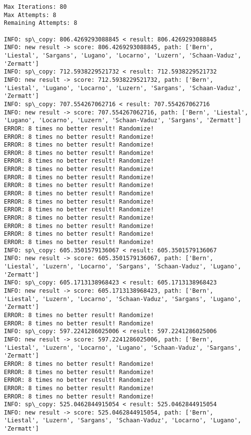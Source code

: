 \documentclass[11pt]{article}
\begin{document}
    \begin{Verbatim}[commandchars=\\\{\}]
Max Iterations: 80
Max Attempts: 8
Remaining Attempts: 8

INFO: sp\_copy: 806.4269293088845 < result: 806.4269293088845
INFO: new result -> score: 806.4269293088845, path: ['Bern', 'Liestal', 'Sargans', 'Lugano', 'Locarno', 'Luzern', 'Schaan-Vaduz', 'Zermatt']
INFO: sp\_copy: 712.5938229521732 < result: 712.5938229521732
INFO: new result -> score: 712.5938229521732, path: ['Bern', 'Liestal', 'Lugano', 'Locarno', 'Luzern', 'Sargans', 'Schaan-Vaduz', 'Zermatt']
INFO: sp\_copy: 707.554267062716 < result: 707.554267062716
INFO: new result -> score: 707.554267062716, path: ['Bern', 'Liestal', 'Lugano', 'Locarno', 'Luzern', 'Schaan-Vaduz', 'Sargans', 'Zermatt']
ERROR: 8 times no better result! Randomize!
ERROR: 8 times no better result! Randomize!
ERROR: 8 times no better result! Randomize!
ERROR: 8 times no better result! Randomize!
ERROR: 8 times no better result! Randomize!
ERROR: 8 times no better result! Randomize!
ERROR: 8 times no better result! Randomize!
ERROR: 8 times no better result! Randomize!
ERROR: 8 times no better result! Randomize!
ERROR: 8 times no better result! Randomize!
ERROR: 8 times no better result! Randomize!
ERROR: 8 times no better result! Randomize!
ERROR: 8 times no better result! Randomize!
ERROR: 8 times no better result! Randomize!
ERROR: 8 times no better result! Randomize!
INFO: sp\_copy: 605.3501579136067 < result: 605.3501579136067
INFO: new result -> score: 605.3501579136067, path: ['Bern', 'Liestal', 'Luzern', 'Locarno', 'Sargans', 'Schaan-Vaduz', 'Lugano', 'Zermatt']
INFO: sp\_copy: 605.1713138968423 < result: 605.1713138968423
INFO: new result -> score: 605.1713138968423, path: ['Bern', 'Liestal', 'Luzern', 'Locarno', 'Schaan-Vaduz', 'Sargans', 'Lugano', 'Zermatt']
ERROR: 8 times no better result! Randomize!
ERROR: 8 times no better result! Randomize!
INFO: sp\_copy: 597.2241286025006 < result: 597.2241286025006
INFO: new result -> score: 597.2241286025006, path: ['Bern', 'Liestal', 'Luzern', 'Locarno', 'Lugano', 'Schaan-Vaduz', 'Sargans', 'Zermatt']
ERROR: 8 times no better result! Randomize!
ERROR: 8 times no better result! Randomize!
ERROR: 8 times no better result! Randomize!
ERROR: 8 times no better result! Randomize!
ERROR: 8 times no better result! Randomize!
INFO: sp\_copy: 525.0462844915054 < result: 525.0462844915054
INFO: new result -> score: 525.0462844915054, path: ['Bern', 'Liestal', 'Luzern', 'Sargans', 'Schaan-Vaduz', 'Locarno', 'Lugano', 'Zermatt']

\end{Verbatim}
\end{document}
